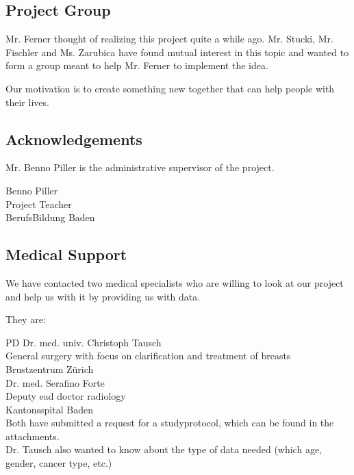 \subsection{Project Group}
Mr. Ferner thought of realizing this project quite a while ago.
Mr. Stucki, Mr. Fischler and Ms. Zarubica have found mutual interest in this topic and wanted to form a group meant to help Mr. Ferner to implement the idea.

Our motivation is to create something new together that can help people with their lives. 

\subsection{Acknowledgements}
Mr. Benno Piller is the administrative supervisor of the project.

Benno Piller\\
Project Teacher\\
BerufsBildung Baden

\subsection{Medical Support}

We have contacted two medical specialists who are willing to look at our project and help us with it by providing us with data.

They are:

PD Dr. med. univ. Christoph Tausch\\
General surgery with focus on clarification and treatment of breasts\\
Brustzentrum Zürich\\


Dr. med. Serafino Forte\\
Deputy ead doctor radiology\\
Kantonsspital Baden\\

Both have submitted a request for a studyprotocol, which can be found in the attachments. \\
Dr. Tausch also wanted to know about the type of data needed (which age, gender, cancer type, etc.)